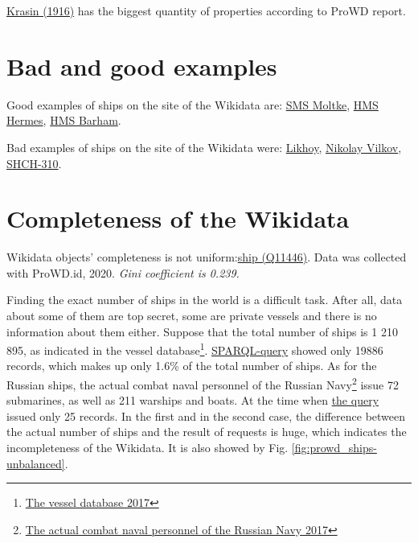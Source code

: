 \href{https://www.wikidata.org/wiki/Q281147}{Krasin (1916)} has the biggest quantity of properties according to ProWD report.
  

\section{Bad and good examples}
Good examples of ships on the site of the Wikidata are: \href{https://www.wikidata.org/wiki/Q613128}{SMS Moltke}, \href{https://www.wikidata.org/wiki/Q596282}{HMS Hermes}, \href{https://www.wikidata.org/wiki/Q598079}{HMS Barham}.

Bad examples of ships on the site of the Wikidata were: \href{https://www.wikidata.org/wiki/Q4264229}{Likhoy}, \href{https://www.wikidata.org/wiki/Q18816894}{Nikolay Vilkov}, \href{https://www.wikidata.org/wiki/Q4528362}{SHCH-310}.



\section{Completeness of the Wikidata}
\begin{marginfigure}[0.0cm]
  {
    \setlength{\fboxsep}{0pt}%
    \setlength{\fboxrule}{1pt}%
  }
  \caption{
    Wikidata objects' completeness is not uniform:\href{https://www.wikidata.org/wiki/Q11446}{ship (Q11446)}. Data was collected with ProWD.id, 2020. \emph{Gini coefficient is 0.239.}
    }%
    \label{fig:prowd_ships-unbalanced}%
  \end{marginfigure}

Finding the exact number of ships in the world is a difficult task. After all, data about some of them are top secret, some are private vessels and there is no information about them either. Suppose that the total number of ships is 1 210 895, as indicated in the vessel database\footnote{\href{http://www.fleetmon.com/vessels}{The vessel database 2017}}. \href{https://w.wiki/koU}{SPARQL-query} showed only \num{19886} records, which makes up only 1.6\% of the total number of ships. As for the Russian ships, the actual combat naval personnel of the Russian Navy\footnote{\href{http://russianships.info/today/}{The actual combat naval personnel of the Russian Navy 2017}} issue 72 submarines, as well as 211 warships and boats. At the time when \href{https://w.wiki/koS}{the query} issued only 25 records. In the first and in the second case, the difference between the actual number of ships and the result of requests is huge, which indicates the incompleteness of the Wikidata. It is also showed by Fig. \ref{fig:prowd_ships-unbalanced}.





